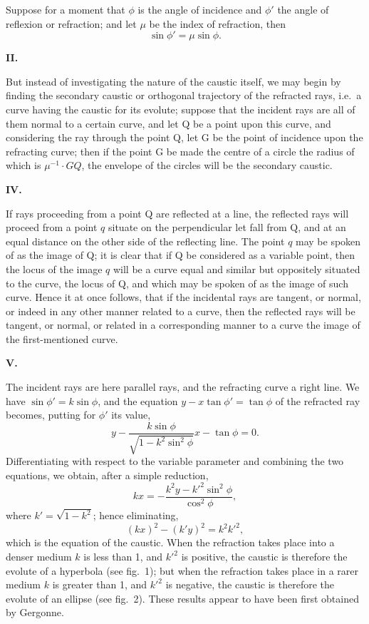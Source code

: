 \documentclass[11pt,a4paper]{article}
\begin{document}
Suppose for a moment that $\phi$ is the angle of incidence and $\phi'$ the angle of
reflexion or refraction; and let $\mu$ be the index of refraction, then
\[\sin\phi' = \mu\sin\phi.\]

\medskip
\noindent\textbf{II.}

But instead of investigating the nature of the caustic itself, we may begin by
finding the secondary caustic or orthogonal trajectory of the refracted rays, i.e.\ a
curve having the caustic for its evolute; suppose that the incident rays are all of
them normal to a certain curve, and let Q be a point upon this curve, and
considering the ray through the point Q, let G be the point of incidence upon the
refracting curve; then if the point G be made the centre of a circle the radius of
which is $\mu^{-1}\cdot GQ$, the envelope of the circles will be the secondary caustic.

\medskip
\noindent\textbf{IV.}

If rays proceeding from a point Q are reflected at a line, the reflected rays will
proceed from a point $q$ situate on the perpendicular let fall from Q, and at an equal
distance on the other side of the reflecting line. The point $q$ may be spoken of as
the image of Q; it is clear that if Q be considered as a variable point, then the
locus of the image $q$ will be a curve equal and similar but oppositely situated to
the curve, the locus of Q, and which may be spoken of as the image of such curve.
Hence it at once follows, that if the incidental rays are tangent, or normal, or indeed
in any other manner related to a curve, then the reflected rays will be tangent, or
normal, or related in a corresponding manner to a curve the image of the first-mentioned curve.

\clearpage
\noindent\textbf{V.}

The incident rays are here parallel rays, and the refracting curve a right line.
We have $\sin\phi' = k\sin\phi$, and the equation $y - x\tan\phi' = \tan\phi$ of the refracted
ray becomes, putting for $\phi'$ its value,
\[y - \frac{k\sin\phi}{\sqrt{1-k^2\sin^2\phi}}x - \tan\phi = 0.\]
Differentiating with respect to the variable parameter and combining the two
equations, we obtain, after a simple reduction,
\[kx = -\frac{k^2y - k'^2\sin^2\phi}{\cos^2\phi},\]
where $k' = \sqrt{1-k^2}$; hence eliminating,
\[(kx)^2 - (k'y)^2 = k^2k'^2,\]
which is the equation of the caustic. When the refraction takes place into a
denser medium $k$ is less than 1, and $k'^2$ is positive, the caustic is therefore the
evolute of a hyperbola (see fig.~1); but when the refraction takes place in a
rarer medium $k$ is greater than 1, and $k'^2$ is negative, the caustic is therefore the
evolute of an ellipse (see fig.~2). These results appear to have been first obtained
by Gergonne.
\end{document}
